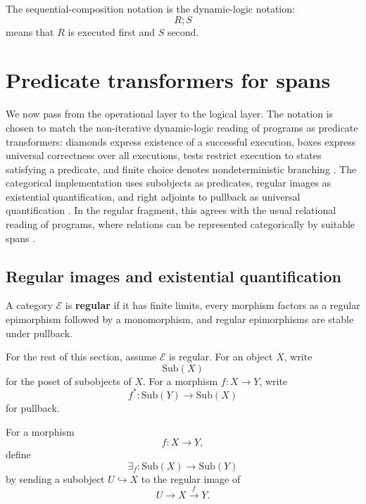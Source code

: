 The sequential-composition notation is the dynamic-logic notation:
\[
    R;S
\]
means that \(R\) is executed first and \(S\) second.

\section{Predicate transformers for spans}
\label{sec:relative-predicate-transformers}

We now pass from the operational layer to the logical layer. The notation is
chosen to match the non-iterative dynamic-logic reading of programs as
predicate transformers: diamonds express existence of a successful execution,
boxes express universal correctness over all executions, tests restrict
execution to states satisfying a predicate, and finite choice denotes
nondeterministic branching \cite{HarelKozenTiurynDynamicLogic}. The
categorical implementation uses subobjects as predicates, regular images as
existential quantification, and right adjoints to pullback as universal
quantification \cite{Jacobs1999CategoricalLogic}. In the regular fragment,
this agrees with the usual relational reading of programs, where relations can
be represented categorically by suitable spans
\cite{FongSpivakRegularRelational}.

\subsection{Regular images and existential quantification}
\label{subsec:relative-regular-images}

\begin{definition}
\label{def:relative-regular-category}
A category \(\mathcal E\) is \textbf{regular} if it has finite limits, every
morphism factors as a regular epimorphism followed by a monomorphism, and
regular epimorphisms are stable under pullback.
\end{definition}

For the rest of this section, assume \(\mathcal E\) is regular. For an object
\(X\), write
\[
\mathrm{Sub}(X)
\]
for the poset of subobjects of \(X\). For a morphism \(f:X\to Y\), write
\[
f^\ast:\mathrm{Sub}(Y)\to\mathrm{Sub}(X)
\]
for pullback.

\begin{definition}
\label{def:relative-existential-image}
For a morphism
\[
f:X\to Y,
\]
define
\[
\exists_f:\mathrm{Sub}(X)\to\mathrm{Sub}(Y)
\]
by sending a subobject \(U\hookrightarrow X\) to the regular image of
\[
U\to X\xrightarrow{f}Y.
\]
\end{definition}

